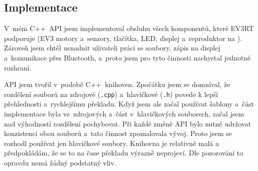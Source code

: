 \subsection{Implementace}


V~mém C++~API jsem implementoval obsluhu všech komponentů, které EV3RT podporuje (EV3 motory a~senzory, tlačítka, LED, displej a~reproduktor na ).
Zároveň jsem chtěl usnadnit uživateli práci se soubory, zápis na displej a~komunikace přes Bluetooth, a~proto jsem pro tyto činnosti nachystal  jednotné rozhraní.

API jsem tvořil v~podobě C++~knihoven. 
Zpočátku jsem se domníval, že rozdělení souborů na zdrojové (\texttt{.cpp}) a~hlavičkové (\texttt{.h}) povede k lepší přehlednosti a~rychlejšímu překladu.
% 
% 
% 
% 
% 
%
%
% 
% 
%
%
%
%
%
%
%
%
Když jsem ale začal používat šablony a~část implementace byla ve~zdrojových a~část v~hlavičkových souborech, začal jsem nad výhodností rozdělení pochybovat.
Při každé změně API bylo nutné udržovat konzistenci obou souborů a~tato činnost zpomalovala vývoj. 
% 
% 
Proto jsem se rozhodl používat jen hlavičkové soubory. Knihovna je relativně malá a předpokládám, že se to na čase překladu výrazně neprojeví.
% 
% 
Dle pozorování to opravdu nemá žádný podstatný vliv.

